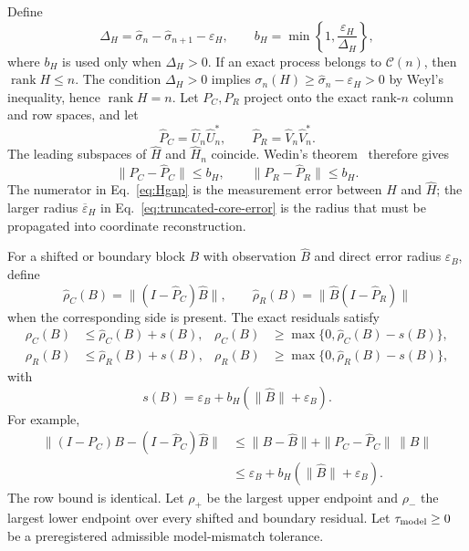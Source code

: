 \documentclass[aps,prl,reprint,superscriptaddress,nofootinbib]{revtex4-2}
\newcommand{\rank}{\operatorname{rank}}
\newcommand{\eps}{\varepsilon}
\newcommand{\cC}{\mathcal C}
\begin{document}
Define
\begin{equation}
 \Delta_H=\widehat\sigma_n-\widehat\sigma_{n+1}-\eps_H,
 \qquad
 b_H=\min\left\{1,\frac{\eps_H}{\Delta_H}\right\},
 \label{eq:Hgap}
\end{equation}
where $b_H$ is used only when $\Delta_H>0$.  If an exact process belongs to $\cC(n)$, then $\rank H\le n$.  The condition $\Delta_H>0$ implies
$\sigma_n(H)\ge\widehat\sigma_n-\eps_H>0$ by Weyl's inequality, hence $\rank H=n$.  Let $P_C,P_R$ project onto the exact rank-$n$ column and row spaces, and let
\begin{equation}
 \widehat P_C=\widehat U_n\widehat U_n^*,
 \qquad
 \widehat P_R=\widehat V_n\widehat V_n^*.
\end{equation}
The leading subspaces of $\widehat H$ and $\widehat H_n$ coincide.  Wedin's theorem~\cite{Wedin1972} therefore gives
\begin{equation}
 \|P_C-\widehat P_C\|\le b_H,
 \qquad
 \|P_R-\widehat P_R\|\le b_H.
 \label{eq:subspace-bounds}
\end{equation}
The numerator in Eq.~\eqref{eq:Hgap} is the measurement error between $H$ and $\widehat H$; the larger radius $\overline\eps_H$ in Eq.~\eqref{eq:truncated-core-error} is the radius that must be propagated into coordinate reconstruction.

For a shifted or boundary block $B$ with observation $\widehat B$ and direct error radius $\eps_B$, define
\begin{equation}
 \widehat\rho_C(B)=\|(I-\widehat P_C)\widehat B\|,
 \qquad
 \widehat\rho_R(B)=\|\widehat B(I-\widehat P_R)\|
 \label{eq:observed-residuals}
\end{equation}
when the corresponding side is present.  The exact residuals satisfy
\begin{align}
 \rho_C(B)&\le\widehat\rho_C(B)+s(B),&
 \rho_C(B)&\ge\max\{0,\widehat\rho_C(B)-s(B)\},\nonumber\\
 \rho_R(B)&\le\widehat\rho_R(B)+s(B),&
 \rho_R(B)&\ge\max\{0,\widehat\rho_R(B)-s(B)\},
 \label{eq:res-bracket}
\end{align}
with
\begin{equation}
 s(B)=\eps_B+b_H(\|\widehat B\|+\eps_B).
 \label{eq:res-slack}
\end{equation}
For example,
\begin{align*}
 \|(I-P_C)B-(I-\widehat P_C)\widehat B\|
 &\le\|B-\widehat B\|+\|P_C-\widehat P_C\|\,\|B\|\\
 &\le\eps_B+b_H(\|\widehat B\|+\eps_B).
\end{align*}
The row bound is identical.  Let $\rho_+$ be the largest upper endpoint and $\rho_-$ the largest lower endpoint over every shifted and boundary residual.  Let $\tau_{\rm model}\ge0$ be a preregistered admissible model-mismatch tolerance.
\end{document}
